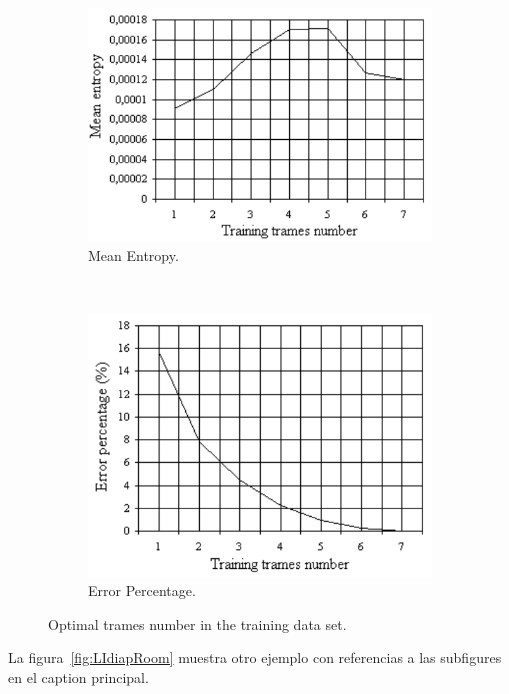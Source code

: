 \documentclass[spanish,openright]{book}
\begin{document}
\begin{figure}
  \centering
  \begin{subfigure}[b]{0.3\textwidth}
    \includegraphics[width=\textwidth]{Figure2}
    \caption{Mean Entropy.}
    \label{fig:fig3a}
  \end{subfigure}~ \begin{subfigure}[b]{0.3\textwidth}
    \includegraphics[width=\textwidth]{Figure3}
    \caption{Error Percentage.}
    \label{fig:fig3b}
  \end{subfigure}
  \caption{Optimal trames number in the training data set.}
  \label{fig:fig3}
\end{figure}

La figura~\ref{fig:LIdiapRoom} muestra otro ejemplo con referencias a
las subfigures en el caption principal. 
\end{document}
